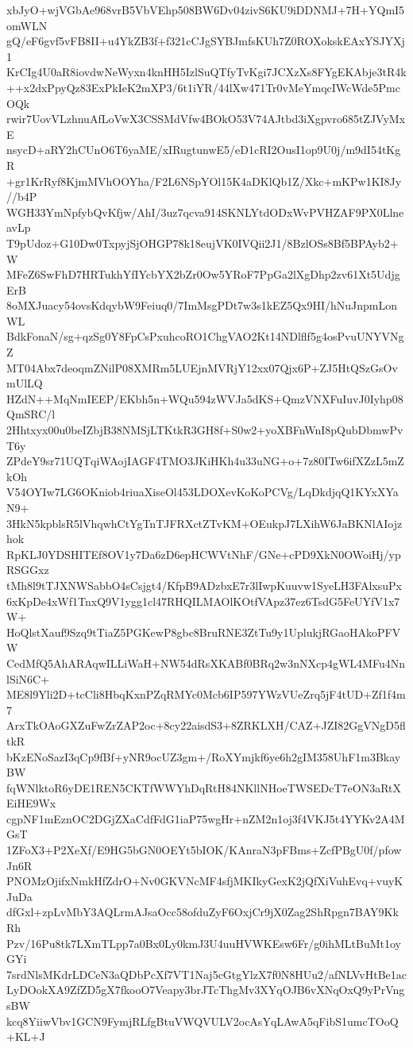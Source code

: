 xbJyO+wjVGbAe968vrB5VbVEhp508BW6Dv04zivS6KU9iDDNMJ+7H+YQmI5omWLN
gQ/eF6gvf5vFB8II+u4YkZB3f+f321cCJgSYBJmfsKUh7Z0ROXokskEAxYSJYXj1
KrCIg4U0aR8iovdwNeWyxn4knHH5IzlSuQTfyTvKgi7JCXzXs8FYgEKAbje3tR4k
++x2dxPpyQz83ExPkIeK2mXP3/6t1iYR/44lXw471Tr0vMeYmqcIWcWde5PmcOQk
rwir7UovVLzhnuAfLoVwX3CSSMdVfw4BOkO53V74AJtbd3iXgpvro685tZJVyMxE
nsycD+aRY2hCUnO6T6yaME/xIRugtunwE5/eD1cRI2OusI1op9U0j/m9dI54tKgR
+gr1KrRyf8KjmMVhOOYha/F2L6NSpYOl15K4aDKlQb1Z/Xkc+mKPw1KI8Jy//b4P
WGH33YmNpfybQvKfjw/AhI/3uz7qcva914SKNLYtdODxWvPVHZAF9PX0LlneavLp
T9pUdoz+G10Dw0TxpyjSjOHGP78k18eujVK0IVQii2J1/8BzlOSs8Bf5BPAyb2+W
MFeZ6SwFhD7HRTukhYfIYcbYX2bZr0Ow5YRoF7PpGa2lXgDhp2zv61Xt5UdjgErB
8oMXJuacy54ovsKdqybW9Feiuq0/7ImMsgPDt7w3s1kEZ5Qx9HI/hNuJnpmLonWL
BdkFonaN/sg+qzSg0Y8FpCsPxuhcoRO1ChgVAO2Kt14NDlflf5g4osPvuUNYVNgZ
MT04Abx7deoqmZNilP08XMRm5LUEjnMVRjY12xx07Qjx6P+ZJ5HtQSzGsOvmUlLQ
HZdN++MqNmIEEP/EKbh5n+WQu594zWVJa5dKS+QmzVNXFuIuvJ0Iyhp08QmSRC/l
2Hhtxyx00u0beIZbjB38NMSjLTKtkR3GH8f+S0w2+yoXBFnWnI8pQubDbmwPvT6y
ZPdeY9sr71UQTqiWAojIAGF4TMO3JKiHKh4u33uNG+o+7z80ITw6ifXZzL5mZkOh
V54OYIw7LG6OKniob4riuaXiseOl453LDOXevKoKoPCVg/LqDkdjqQ1KYxXYaN9+
3HkN5kpblsR5lVhqwhCtYgTnTJFRXctZTvKM+OEukpJ7LXihW6JaBKNlAIojzhok
RpKLJ0YDSHITEf8OV1y7Da6zD6epHCWVtNhF/GNe+cPD9XkN0OWoiHj/ypRSGGxz
tMh8l9tTJXNWSabbO4sCsjgt4/KfpB9ADzbxE7r3lIwpKuuvw1SyeLH3FAlxsuPx
6xKpDe4xWf1TnxQ9V1ygg1cl47RHQILMAOlKOtfVApz37ez6TsdG5FeUYfV1x7W+
HoQlstXauf9Szq9tTiaZ5PGKewP8gbc8BruRNE3ZtTu9y1UplukjRGaoHAkoPFVW
CedMfQ5AhARAqwILLiWaH+NW54dRsXKABf0BRq2w3nNXcp4gWL4MFu4NnlSiN6C+
ME8l9Yli2D+tcCli8HbqKxnPZqRMYc0Mcb6IP597YWzVUeZrq5jF4tUD+Zf1f4m7
ArxTkOAoGXZuFwZrZAP2oc+8cy22aisdS3+8ZRKLXH/CAZ+JZI82GgVNgD5fltkR
bKzENoSazI3qCp9fBf+yNR9ocUZ3gm+/RoXYmjkf6ye6h2gIM358UhF1m3BkayBW
fqWNlktoR6yDE1REN5CKTfWWYhDqRtH84NKllNHoeTWSEDcT7eON3aRtXEiHE9Wx
cgpNF1mEznOC2DGjZXaCdfFdG1iaP75wgHr+nZM2n1oj3f4VKJ5t4YYKv2A4MGsT
1ZFoX3+P2XeXf/E9HG5bGN0OEYt5bIOK/KAnraN3pFBms+ZcfPBgU0f/pfowJn6R
PNOMzOjifxNmkHfZdrO+Nv0GKVNcMF4sfjMKIkyGexK2jQfXiVuhEvq+vuyKJuDa
dfGxl+zpLvMbY3AQLrmAJsaOcc58ofduZyF6OxjCr9jX0Zag2ShRpgn7BAY9KkRh
Pzv/16Pu8tk7LXmTLpp7a0Bx0Ly0kmJ3U4uuHVWKEsw6Fr/g0ihMLtBuMt1oyGYi
7srdNlsMKdrLDCeN3aQDbPcXf7VT1Naj5cGtgYlzX7f0N8HUu2/afNLVvHtBe1ac
LyDOokXA9ZfZD5gX7fkooO7Veapy3brJTcThgMv3XYqOJB6vXNqOxQ9yPrVngsBW
kcq8YiiwVbv1GCN9FymjRLfgBtuVWQVULV2ocAsYqLAwA5qFibS1umcTOoQ+KL+J
